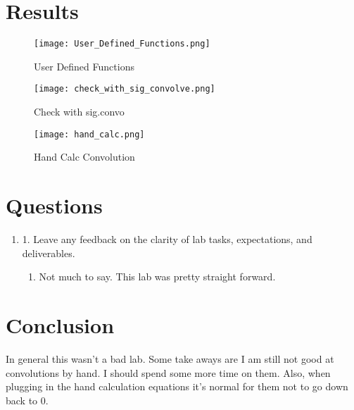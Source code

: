 \documentclass[12pt]{article}
\begin{document}
\section*{Results}

\begin{figure}[H]
\caption{User Defined Functions}
\centering
\texttt{[image: User\_Defined\_Functions.png]}
\end{figure}

\begin{figure}[H]
\caption{Check with sig.convo}
\centering
\texttt{[image: check\_with\_sig\_convolve.png]}
\end{figure}

\begin{figure}[H]
\caption{Hand Calc Convolution}
\centering
\texttt{[image: hand\_calc.png]}
\end{figure}

\section*{Questions}

\begin{enumerate}
    \item 1. Leave any feedback on the clarity of lab tasks, expectations, and deliverables.
    \begin{enumerate}
        \item Not much to say. This lab was pretty straight forward.
    \end{enumerate}
\end{enumerate}

\section*{Conclusion}

In general this wasn't a bad lab. Some take aways are I am still not good at convolutions by hand. I should spend some more time on them. Also, when plugging in the hand calculation equations it's normal for them not to go down back to 0.
\end{document}
